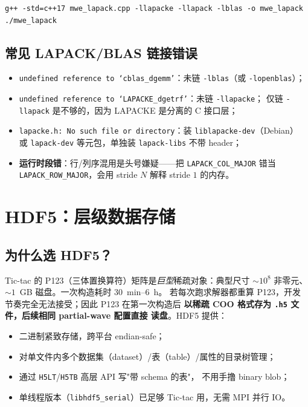 \begin{lstlisting}[style=config,caption={编译。}]
g++ -std=c++17 mwe_lapack.cpp -llapacke -llapack -lblas -o mwe_lapack
./mwe_lapack
\end{lstlisting}

\subsection{常见 LAPACK/BLAS 链接错误}

\begin{itemize}
\item \texttt{undefined reference to `cblas\_dgemm'}：未链 \texttt{-lblas}（或 \texttt{-lopenblas}）；
\item \texttt{undefined reference to `LAPACKE\_dgetrf'}：未链 \texttt{-llapacke}；
      仅链 \texttt{-llapack} 是不够的，因为 LAPACKE 是分离的 C 接口层；
\item \texttt{lapacke.h: No such file or directory}：装 \texttt{liblapacke-dev}（Debian）
      或 \texttt{lapack-dev} 等元包，单独装 \texttt{lapack-libs} 不带 header；
\item \textbf{运行时段错}：行/列序混用是头号嫌疑——把 \texttt{LAPACK\_COL\_MAJOR} 错当
      \texttt{LAPACK\_ROW\_MAJOR}，会用 stride $N$ 解释 stride $1$ 的内存。
\end{itemize}


\section{HDF5：层级数据存储}
\label{sec:appD:hdf5}

\subsection{为什么选 HDF5？}

Tic-tac 的 P123（三体置换算符）矩阵是\emph{巨型}稀疏对象：典型尺寸
$\sim 10^{8}$ 非零元、$\sim 1$~GB 磁盘。一次构造耗时 30~min--6~h。
若每次跑求解器都重算 P123，开发节奏完全无法接受；因此 P123 在第一次构造后
\textbf{以稀疏 COO 格式存为 \texttt{.h5} 文件，后续相同 partial-wave 配置直接
读盘}。HDF5 提供：
\begin{itemize}
\item 二进制紧致存储，跨平台 endian-safe；
\item 对单文件内多个数据集（dataset）/表（table）/属性的目录树管理；
\item 通过 \texttt{H5LT}/\texttt{H5TB} 高层 API 写"带 schema 的表"，
      不用手撸 binary blob；
\item 单线程版本（\texttt{libhdf5\_serial}）已足够 Tic-tac 用，无需 MPI 并行 IO。
\end{itemize}

